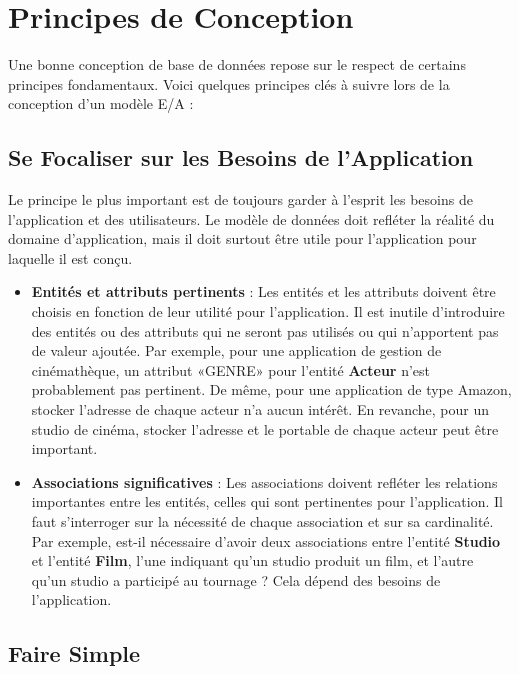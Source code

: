 \documentclass{article}
\begin{document}
\section{Principes de Conception}

Une bonne conception de base de données repose sur le respect de certains principes fondamentaux.  Voici quelques principes clés à suivre lors de la conception d'un modèle E/A :

\subsection{Se Focaliser sur les Besoins de l'Application}

Le principe le plus important est de toujours garder à l'esprit les besoins de l'application et des utilisateurs.  Le modèle de données doit refléter la réalité du domaine d'application, mais il doit surtout être utile pour l'application pour laquelle il est conçu.

\begin{itemize}
    \item \textbf{Entités et attributs pertinents} :  Les entités et les attributs doivent être choisis en fonction de leur utilité pour l'application.  Il est inutile d'introduire des entités ou des attributs qui ne seront pas utilisés ou qui n'apportent pas de valeur ajoutée. Par exemple, pour une application de gestion de cinémathèque, un attribut «GENRE» pour l'entité \textbf{Acteur} n'est probablement pas pertinent.  De même, pour une application de type Amazon, stocker l'adresse de chaque acteur n'a aucun intérêt.  En revanche, pour un studio de cinéma, stocker l'adresse et le portable de chaque acteur peut être important.
    \item \textbf{Associations significatives} :  Les associations doivent refléter les relations importantes entre les entités, celles qui sont pertinentes pour l'application.  Il faut s'interroger sur la nécessité de chaque association et sur sa cardinalité.  Par exemple, est-il nécessaire d'avoir deux associations entre l'entité \textbf{Studio} et l'entité \textbf{Film}, l'une indiquant qu'un studio produit un film, et l'autre qu'un studio a participé au tournage ? Cela dépend des besoins de l'application.
\end{itemize}

\subsection{Faire Simple}
\end{document}
